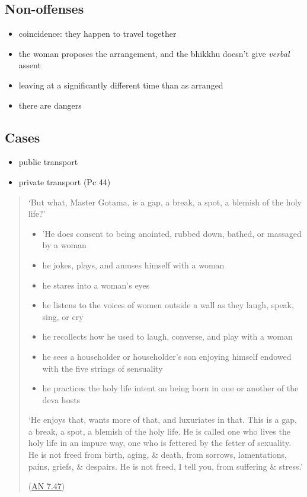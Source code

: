 \begin{multicols}{2}

\subsection{Non-offenses}

\begin{itemize}
\tightlist
\item
  coincidence: they happen to travel together
\item
  the woman proposes the arrangement, and the bhikkhu doesn't give
  \emph{verbal} assent
\item
  leaving at a significantly different time than as arranged
\item
  there are dangers
\end{itemize}

\columnbreak

\subsection{Cases}

\begin{itemize}
\tightlist
\item
  public transport
\item
  private transport (Pc 44)
\end{itemize}

\end{multicols}
\clearpage

\begin{quote}
`But what, Master Gotama, is a gap, a break, a spot, a blemish of the
holy life?'

\begin{itemize}
\tightlist
\item
  'He does consent to being anointed, rubbed down, bathed, or massaged
  by a woman
\item
  he jokes, plays, and amuses himself with a woman
\item
  he stares into a woman's eyes
\item
  he listens to the voices of women outside a wall as they laugh, speak,
  sing, or cry
\item
  he recollects how he used to laugh, converse, and play with a woman
\item
  he sees a householder or householder's son enjoying himself endowed
  with the five strings of sensuality
\item
  he practices the holy life intent on being born in one or another of
  the deva hosts
\end{itemize}

`He enjoys that, wants more of that, and luxuriates in that. This is a
gap, a break, a spot, a blemish of the holy life. He is called one who
lives the holy life in an impure way, one who is fettered by the fetter
of sexuality. He is not freed from birth, aging, \& death, from sorrows,
lamentations, pains, griefs, \& despairs. He is not freed, I tell you,
from suffering \& stress.'

(\href{https://www.dhammatalks.org/suttas/AN/AN7_47.html}{AN 7.47})
\end{quote}

